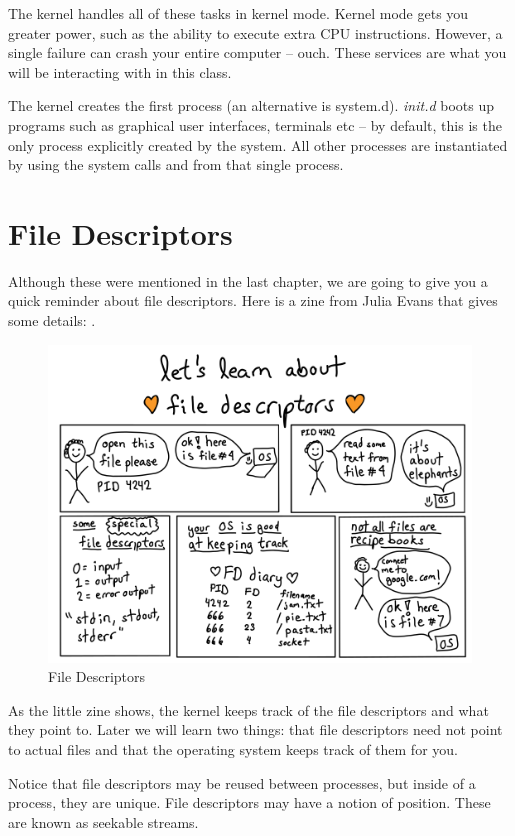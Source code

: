 The kernel handles all of these tasks in kernel mode.
Kernel mode gets you greater power, such as the ability to execute extra CPU instructions. 
However, a single failure can crash your entire computer -- ouch.
These services are what you will be interacting with in this class.

The kernel creates the first process  (an alternative is system.d). \emph{init.d} boots up programs such as graphical user interfaces, terminals etc -- by default, this is the only process explicitly created by the system.
All other processes are instantiated by using the system calls  and  from that single process.

\section{File Descriptors}

Although these were mentioned in the last chapter, we are going to give you a quick reminder about file descriptors.
Here is a zine from Julia Evans that gives some details: \cite{evans_2018}.

\begin{figure}[htbp]
    \centering
    \includegraphics[width=.8\textwidth]{processes/images/file-descriptors.png}
    \caption{File Descriptors}
\end{figure}

As the little zine shows, the kernel keeps track of the file descriptors and what they point to.
Later we will learn two things: that file descriptors need not point to actual files and that the operating system keeps track of them for you.

Notice that file descriptors may be reused between processes, but inside of a process, they are unique.
File descriptors may have a notion of position. These are known as seekable streams.

